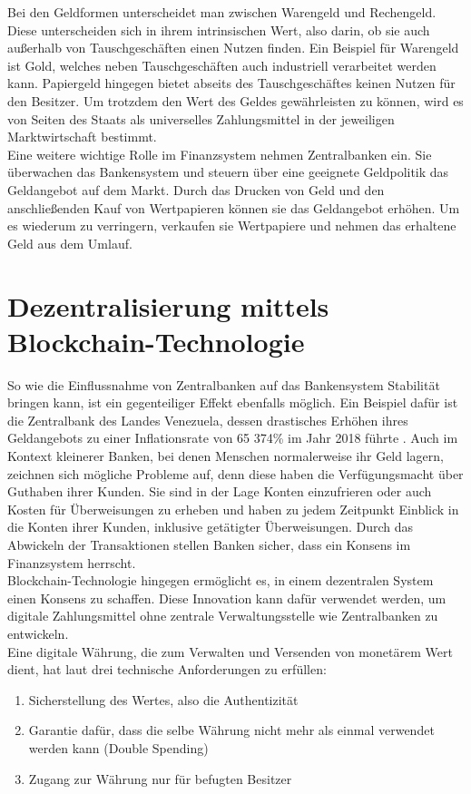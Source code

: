 Bei den Geldformen unterscheidet man zwischen Warengeld und Rechengeld. Diese unterscheiden sich in ihrem intrinsischen Wert, also darin, ob sie auch außerhalb von Tauschgeschäften einen Nutzen finden. Ein Beispiel für Warengeld ist Gold, welches neben Tauschgeschäften auch industriell verarbeitet werden kann.
Papiergeld hingegen bietet abseits des Tauschgeschäftes keinen Nutzen für den Besitzer. Um trotzdem den Wert des Geldes gewährleisten zu können, wird es von Seiten des Staats als universelles Zahlungsmittel in der jeweiligen Marktwirtschaft bestimmt.\\

Eine weitere wichtige Rolle im Finanzsystem nehmen Zentralbanken ein. Sie überwachen das Bankensystem und steuern über eine geeignete Geldpolitik das Geldangebot auf dem Markt.
Durch das Drucken von Geld und den anschließenden Kauf von Wertpapieren können sie das Geldangebot erhöhen. Um es wiederum zu verringern, verkaufen sie Wertpapiere und nehmen das erhaltene Geld aus dem Umlauf.\\

\section{Dezentralisierung mittels Blockchain-Technologie}
So wie die Einflussnahme von Zentralbanken auf das Bankensystem Stabilität bringen kann, ist ein gegenteiliger Effekt ebenfalls möglich. Ein Beispiel dafür ist die Zentralbank des Landes Venezuela, dessen drastisches Erhöhen ihres Geldangebots zu einer Inflationsrate von 65 374\% im Jahr 2018 führte \cite{statista_inflation_2021}. Auch im Kontext kleinerer Banken, bei denen Menschen normalerweise ihr Geld lagern, zeichnen sich mögliche Probleme auf, denn diese haben die Verfügungsmacht über Guthaben ihrer Kunden. Sie sind in der Lage Konten einzufrieren oder auch Kosten für Überweisungen zu erheben und haben zu jedem Zeitpunkt Einblick in die Konten ihrer Kunden, inklusive getätigter Überweisungen. Durch das Abwickeln der Transaktionen stellen Banken sicher, dass ein Konsens im Finanzsystem herrscht.\\

Blockchain-Technologie hingegen ermöglicht es, in einem dezentralen System einen Konsens zu schaffen. Diese Innovation kann dafür verwendet werden, um digitale Zahlungsmittel ohne zentrale Verwaltungsstelle wie Zentralbanken zu entwickeln.\\

Eine digitale Währung, die zum Verwalten und Versenden von monetärem Wert dient, hat laut \cite{antanopoulos_2014} drei technische Anforderungen zu erfüllen:
\begin{enumerate}
	\item Sicherstellung des Wertes, also die Authentizität
	\item Garantie dafür, dass die selbe Währung nicht mehr als einmal verwendet werden kann (Double Spending)
	\item Zugang zur Währung nur für befugten Besitzer
\end{enumerate}

